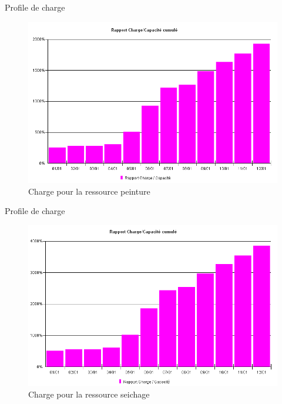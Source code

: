 \begin{frame}{Profile de charge}
\begin{figure}[H]
\centering
\includegraphics[scale=0.4]{../Organisationnelle/captures/charge_pein.PNG}
\caption{Charge pour la ressource peinture}
\end{figure}
\end{frame}


\begin{frame}{Profile de charge}
\begin{figure}[H]
\centering
\includegraphics[scale=0.4]{../Organisationnelle/captures/charge_sei.PNG}
\caption{Charge pour la ressource seichage}
\end{figure}
\end{frame}
	
